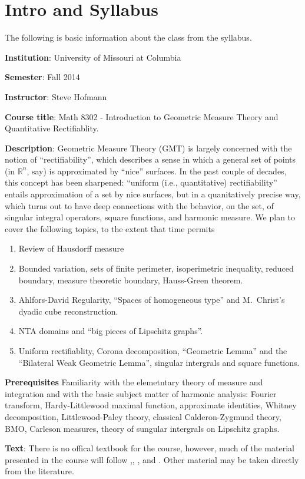 \chapter{Intro and Syllabus}

The following is basic information about the class from the syllabus.

\textbf{Institution}: University of Missouri at Columbia

\textbf{Semester}: Fall 2014

\textbf{Instructor}: Steve Hofmann

\textbf{Course title}: Math 8302 - Introduction to Geometric Measure Theory and
Quantitative Rectifiablity.

\textbf{Description}: Geometric Measure Theory (GMT) is largely concerned with
the notion of ``rectifiability'', which describes a sense in which a
general set of points (in $\mathbb{R}^n$, say) is approximated by
``nice'' surfaces. In the past couple of decades, this concept has been
sharpened: ``uniform (i.e., quantitative) rectifiability'' entails
approximation of a set by nice surfaces, but in a quanitatively precise
way, which turns out to have deep connections with the behavior, on the
set, of singular integral operators, square functions, and harmonic
measure. We plan to cover the following topics, to the extent that time
permits
\begin{enumerate}
  \item Review of Hausdorff measure
  \item Bounded variation, sets of finite perimeter,
    isoperimetric inequality, reduced boundary, measure theoretic
    boundary, Hauss-Green theorem.
  \item Ahlfors-David Regularity, ``Spaces of homogeneous type'' and
    M.\ Christ's dyadic cube reconstruction.
  \item NTA domains and ``big pieces of Lipschitz graphs''.
  \item Uniform rectifiablity, Corona decomposition, ``Geometric
    Lemma'' and the ``Bilateral Weak Geometric Lemma'', singular
    intergrals and square functions.
\end{enumerate}

\textbf{Prerequisites} Familiarity with the elemetntary theory of measure and
  integration and with the basic subject matter of harmonic analysis:
  Fourier transform, Hardy-Littlewood maximal function, approximate
  identities, Whitney decomposition, Littlewood-Paley theory,
  classical Calderon-Zygmund theory, BMO, Carleson measures, theory of
  sungular intergrals on Lipschitz graphs.

  \textbf{Text}: There is no offical textbook for the course, however,
  much of the material presented in the course will follow
  \cite{david1991singular},\cite{david1993analysis},
  \cite{evans1991measure}, and \cite{wheeden1977measure}. Other material
  may be taken directly from the literature.

